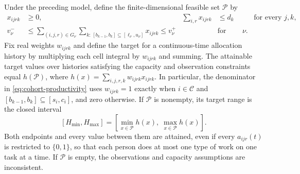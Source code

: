 \begin{proposition}
\label{prop:cell-reduction}
Under the preceding model, define the finite-dimensional feasible set $\mathcal P$ by
\begin{align}
\label{eq:cell-capacity}
 x_{ijrk}&\geq0,&\sum_{i,r}x_{ijrk}&\leq d_k
 &&\text{for every }j,k,\\
\label{eq:cell-information}
 v_\nu^-&\leq
 \sum_{(i,j,r)\in G_\nu}
 \sum_{k:\,[b_{k-1},b_k]\subseteq[\ell_\nu,u_\nu]}x_{ijrk}
 \leq v_\nu^+ &&\text{for every }\nu.
\end{align}
Fix real weights $w_{ijrk}$ and define the target for a continuous-time allocation history by multiplying each cell integral by $w_{ijrk}$ and summing. The attainable target values over histories satisfying the capacity and observation constraints equal $h(\mathcal P)$, where $h(x)=\sum_{i,j,r,k}w_{ijrk}x_{ijrk}$. In particular, the denominator in \eqref{eq:cohort-productivity} uses $w_{ijrk}=1$ exactly when $i\in\mathcal C$ and $[b_{k-1},b_k]\subseteq[s_i,c_i]$, and zero otherwise. If $\mathcal P$ is nonempty, its target range is the closed interval
\begin{equation}
\label{eq:sharp-labour-range}
 [H_{\min},H_{\max}]
 =\left[\min_{x\in\mathcal P}h(x),\;\max_{x\in\mathcal P}h(x)\right].
\end{equation}
Both endpoints and every value between them are attained, even if every $a_{ijr}(t)$ is restricted to $\{0,1\}$, so that each person does at most one type of work on one task at a time. If $\mathcal P$ is empty, the observations and capacity assumptions are inconsistent.
\end{proposition}
